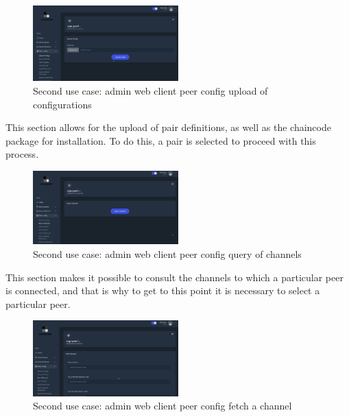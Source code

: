 \begin{figure}[H]
    \centering
    \includegraphics[width=0.5\textwidth]{assets/use-case-2/peer-config-upload-configs.png} %
    \caption{Second use case: admin web client peer config upload of configurations}
    \label{fig:sample-image} 
\end{figure}

This section allows for the upload of pair definitions, as well as the chaincode package for installation. To do this, a pair is selected to proceed with this process.

\begin{figure}[H]
    \centering
    \includegraphics[width=0.5\textwidth]{assets/use-case-2/peer-config-query-channels.png} %
    \caption{Second use case: admin web client peer config query of channels}
    \label{fig:sample-image} 
\end{figure}

This section makes it possible to consult the channels to which a particular peer is connected, and that is why to get to this point it is necessary to select a particular peer.

\begin{figure}[H]
    \centering
    \includegraphics[width=0.5\textwidth]{assets/use-case-2/peer-config-fetch-channel.png} %
    \caption{Second use case: admin web client peer config fetch a channel}
    \label{fig:sample-image} 
\end{figure}

